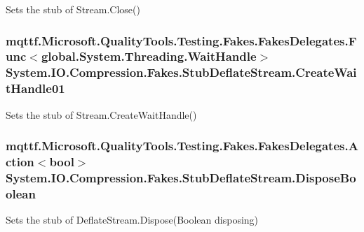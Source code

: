Sets the stub of Stream.\-Close()

\hypertarget{class_system_1_1_i_o_1_1_compression_1_1_fakes_1_1_stub_deflate_stream_a39c05aa42e9aeaf462102de98164e5a6}{
\subsubsection[{Create\-Wait\-Handle01}]{\setlength{\rightskip}{0pt plus 5cm}mqttf.\-Microsoft.\-Quality\-Tools.\-Testing.\-Fakes.\-Fakes\-Delegates.\-Func$<$global.\-System.\-Threading.\-Wait\-Handle$>$ System.\-I\-O.\-Compression.\-Fakes.\-Stub\-Deflate\-Stream.\-Create\-Wait\-Handle01}}\label{class_system_1_1_i_o_1_1_compression_1_1_fakes_1_1_stub_deflate_stream_a39c05aa42e9aeaf462102de98164e5a6}


Sets the stub of Stream.\-Create\-Wait\-Handle()

\hypertarget{class_system_1_1_i_o_1_1_compression_1_1_fakes_1_1_stub_deflate_stream_accb9e0c3f7e3ecc4d50aaa953e8973e9}{
\subsubsection[{Dispose\-Boolean}]{\setlength{\rightskip}{0pt plus 5cm}mqttf.\-Microsoft.\-Quality\-Tools.\-Testing.\-Fakes.\-Fakes\-Delegates.\-Action$<$bool$>$ System.\-I\-O.\-Compression.\-Fakes.\-Stub\-Deflate\-Stream.\-Dispose\-Boolean}}\label{class_system_1_1_i_o_1_1_compression_1_1_fakes_1_1_stub_deflate_stream_accb9e0c3f7e3ecc4d50aaa953e8973e9}


Sets the stub of Deflate\-Stream.\-Dispose(\-Boolean disposing)

